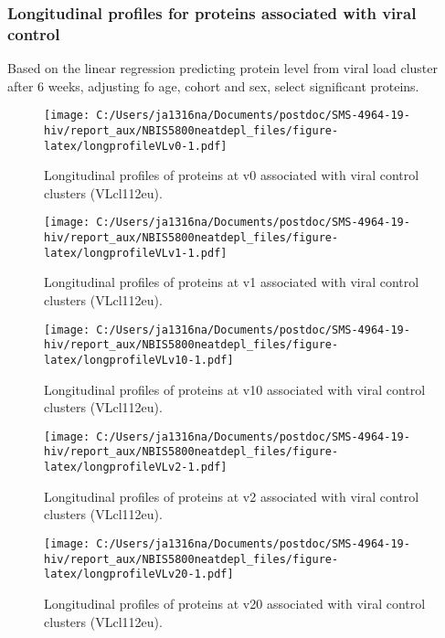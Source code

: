 \documentclass[
]{article}
\begin{document}
\FloatBarrier

\hypertarget{longitudinal-profiles-for-proteins-associated-with-viral-control}{%
\subsubsection{Longitudinal profiles for proteins associated with viral control}\label{longitudinal-profiles-for-proteins-associated-with-viral-control}}

Based on the linear regression predicting protein level from viral load cluster after 6 weeks, adjusting fo age, cohort and sex, select significant proteins.

\begin{figure}
\centering
\texttt{[image: C:/Users/ja1316na/Documents/postdoc/SMS-4964-19-hiv/report\_aux/NBIS5800neatdepl\_files/figure-latex/longprofileVLv0-1.pdf]}
\caption{\label{fig:longprofileVLv0}Longitudinal profiles of proteins at v0 associated with viral control clusters (VLcl112eu).}
\end{figure}

\begin{figure}
\centering
\texttt{[image: C:/Users/ja1316na/Documents/postdoc/SMS-4964-19-hiv/report\_aux/NBIS5800neatdepl\_files/figure-latex/longprofileVLv1-1.pdf]}
\caption{\label{fig:longprofileVLv1}Longitudinal profiles of proteins at v1 associated with viral control clusters (VLcl112eu).}
\end{figure}

\begin{figure}
\centering
\texttt{[image: C:/Users/ja1316na/Documents/postdoc/SMS-4964-19-hiv/report\_aux/NBIS5800neatdepl\_files/figure-latex/longprofileVLv10-1.pdf]}
\caption{\label{fig:longprofileVLv10}Longitudinal profiles of proteins at v10 associated with viral control clusters (VLcl112eu).}
\end{figure}

\begin{figure}
\centering
\texttt{[image: C:/Users/ja1316na/Documents/postdoc/SMS-4964-19-hiv/report\_aux/NBIS5800neatdepl\_files/figure-latex/longprofileVLv2-1.pdf]}
\caption{\label{fig:longprofileVLv2}Longitudinal profiles of proteins at v2 associated with viral control clusters (VLcl112eu).}
\end{figure}

\begin{figure}
\centering
\texttt{[image: C:/Users/ja1316na/Documents/postdoc/SMS-4964-19-hiv/report\_aux/NBIS5800neatdepl\_files/figure-latex/longprofileVLv20-1.pdf]}
\caption{\label{fig:longprofileVLv20}Longitudinal profiles of proteins at v20 associated with viral control clusters (VLcl112eu).}
\end{figure}
\end{document}
